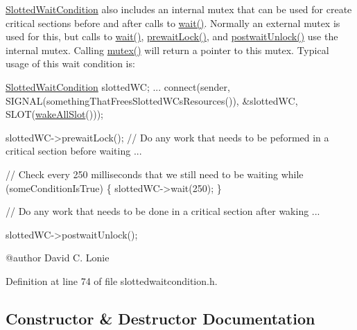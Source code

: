\hyperlink{classGlobalSearch_1_1SlottedWaitCondition}{Slotted\+Wait\+Condition} also includes an internal mutex that can be used for create critical sections before and after calls to \hyperlink{classGlobalSearch_1_1SlottedWaitCondition_a30999486ab4737cda3c4e93f8625ac1f}{wait()}. Normally an external mutex is used for this, but calls to \hyperlink{classGlobalSearch_1_1SlottedWaitCondition_a30999486ab4737cda3c4e93f8625ac1f}{wait()}, \hyperlink{classGlobalSearch_1_1SlottedWaitCondition_afb1ba4315ffa2de59eaf5045d2a4c09f}{prewait\+Lock()}, and \hyperlink{classGlobalSearch_1_1SlottedWaitCondition_a3c9f9e3ba7eebdc3cc270445385e334c}{postwait\+Unlock()} use the internal mutex. Calling \hyperlink{classGlobalSearch_1_1SlottedWaitCondition_af548d9a604d2ec84083e5c92ca1a3849}{mutex()} will return a pointer to this mutex. Typical usage of this wait condition is\+: 
\begin{DoxyCode}
\hyperlink{classGlobalSearch_1_1SlottedWaitCondition_a4fd4c5343242d8961fd893012ba9f54b}{SlottedWaitCondition} slottedWC;
...
connect(sender, SIGNAL(somethingThatFreesSlottedWCsResources()),
        &slottedWC, SLOT(\hyperlink{classGlobalSearch_1_1SlottedWaitCondition_a4024066fe5db52f2e2c9257fcfbb5320}{wakeAllSlot}()));

slottedWC->prewaitLock();
\textcolor{comment}{// Do any work that needs to be peformed in a critical section before waiting}
...

\textcolor{comment}{// Check every 250 milliseconds that we still need to be waiting}
while (someConditionIsTrue) \{
  slottedWC->wait(250);
\}

\textcolor{comment}{// Do any work that needs to be done in a critical section after waking}
...

slottedWC->postwaitUnlock();
\end{DoxyCode}
 \begin{DoxyVerb} @author David C. Lonie\end{DoxyVerb}
 

Definition at line 74 of file slottedwaitcondition.\+h.



\subsection{Constructor \& Destructor Documentation}
\hypertarget{classGlobalSearch_1_1SlottedWaitCondition_a4fd4c5343242d8961fd893012ba9f54b}{}
